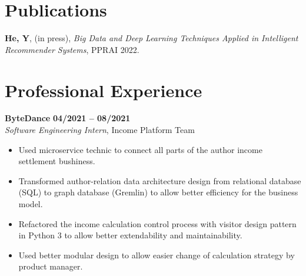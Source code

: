 \documentclass[margin,line]{res}
\begin{document}
\begin{resume}
%



\section{\sc Publications}
\textbf{He, Y}, (in press), \textit{Big Data and Deep Learning Techniques Applied in Intelligent Recommender Systems}, PPRAI 2022.

\section{\sc Professional Experience}

{\bf ByteDance} \hfill {\bf 04/2021 -- 08/2021} \\
\textit{Software Engineering Intern}, {Income Platform Team}
\begin{itemize}
	\item Used microservice technic to connect all parts of the author income settlement bushiness.
	\item Transformed author-relation data architecture design from relational database (SQL) to graph database (Gremlin) to allow better efficiency for the business model.
	\item Refactored the income calculation control process with visitor design pattern in Python 3 to allow better extendability and maintainability.
	\item Used better modular design to allow easier change of calculation strategy by product manager.
\end{itemize}

\vspace{-.3cm}


\end{resume}
\end{document}
